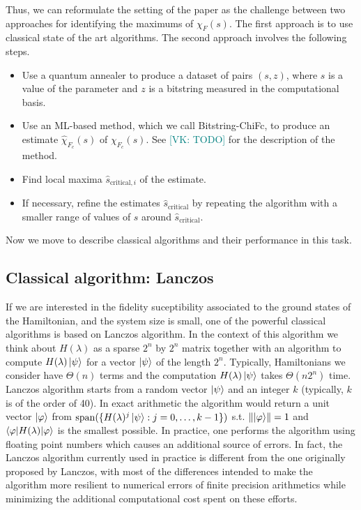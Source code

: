 \documentclass[
  american,aps,pra,reprint,floatfix,nofootinbib,superscriptaddress
]{revtex4-2}
\DeclareMathOperator{\mspan}{span}
\newcommand{\norm}[1]{\left\|#1\right\|}
\newcommand{\VK}[1]{\textcolor{teal}{[VK: #1]}}
\begin{document}
Thus, we can reformulate the setting of the paper as the challenge
between two approaches for identifying the maximums of $\chi_F(s)$.
The first approach is to use classical state of the art algorithms.
The second approach involves the following steps.
\begin{itemize}
  \item Use a quantum annealer to produce a dataset of pairs $(s,z)$,
    where $s$ is a value of the parameter and $z$ is a bitstring
    measured in the computational basis.
  \item Use an ML-based method, which we call Bitstring-ChiFc,
    to produce an estimate
    $\widehat\chi_{F_c}(s)$ of $\chi_{F_c}(s)$.
    See \VK{TODO} for the description of the method.
  \item Find local maxima $\hat s_{\textrm{critical},i}$ of the estimate.
  \item If necessary, refine the estimates $\hat s_{\textrm{critical}}$
    by repeating the algorithm with a smaller range of values of $s$
    around $\hat s_{\textrm{critical}}$.
\end{itemize}

Now we move to describe classical algorithms and their performance in this
task.

\subsection{Classical algorithm: Lanczos}
If we are interested in the fidelity suceptibility associated
to the ground states of the Hamiltonian, and the system size is small,
one of the powerful classical algorithms is based on Lanczos algorithm.
In the context of this algorithm we think about $H(\lambda)$ as
a sparse $2^n$ by $2^n$ matrix together with an algorithm to compute
$H(\lambda)\ket{\psi}$ for a vector $\ket{\psi}$ of the length $2^n$.
Typically, Hamiltonians we consider have
$\Theta(n)$ terms and the computation $H(\lambda)\ket{\psi}$
takes $\Theta(n2^n)$ time. Lanczos algorithm starts from
a random vector $\ket{\psi}$ and an integer $k$ (typically,
$k$ is of the order of 40). In exact arithmetic the algorithm would
return a unit vector $\ket{\varphi}$ from
$\mspan(\{H(\lambda)^j\ket{\psi}: j=0,\dots,k-1\})$
s.t. $\norm{\ket{\varphi}} = 1$ and $\braket{\varphi|H(\lambda)|\varphi}$
is the smallest possible. In practice, one performs the algorithm
using floating point numbers which causes an additional source of errors.
In fact, the Lanczos algorithm currently used in practice is different
from the one originally proposed by Lanczos, with most of the differences
intended to make the algorithm more resilient to numerical errors of
finite precision arithmetics while minimizing the additional computational
cost spent on these efforts.
\end{document}
